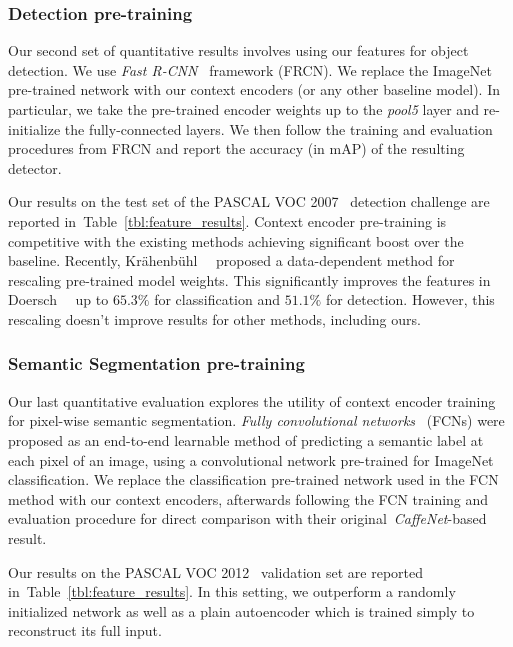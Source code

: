 \documentclass[10pt,twocolumn,letterpaper]{article}
\newcommand{\reftbl}[1]{Table~\ref{tbl:#1}}
\begin{document}
\subsubsection{Detection pre-training}
\label{sec:detect}
Our second set of quantitative results involves using our features for object detection.
We use \textit{Fast R-CNN}~\cite{fastrcnn} framework (FRCN).
We replace the ImageNet pre-trained network with our context encoders (or any other baseline model).
In particular, we take the pre-trained encoder weights up to the \textit{pool5} layer and re-initialize the fully-connected layers.
We then follow the training and evaluation procedures from FRCN and report the accuracy (in mAP) of the resulting detector.

Our results on the test set of the PASCAL VOC 2007~\cite{everingham2014pascal} detection challenge are reported in~\reftbl{feature_results}.
Context encoder pre-training is competitive with the existing methods achieving significant boost over the baseline.
Recently, Kr\"ahenb\"uhl~\etal~\cite{krahenbuhl2015data} proposed a data-dependent method for rescaling pre-trained model weights.
This significantly improves the features in Doersch~\etal~\cite{doersch2015unsupervised} up to $65.3\%$ for classification and $51.1\%$ for detection.
However, this rescaling doesn't improve results for other methods, including ours.


\subsubsection{Semantic Segmentation pre-training}
\label{sec:fcn}
Our last quantitative evaluation explores the utility of context encoder training for pixel-wise semantic segmentation.
\textit{Fully convolutional networks}~\cite{long2014fully} (FCNs) were proposed as an end-to-end learnable method of predicting a semantic label at each pixel of an image, using a convolutional network pre-trained for ImageNet classification.
We replace the classification pre-trained network used in the FCN method with our context encoders, afterwards following the FCN training and evaluation procedure for direct comparison with their original~\textit{CaffeNet}-based result.

Our results on the PASCAL VOC 2012~\cite{everingham2014pascal} validation set are reported in~\reftbl{feature_results}.
In this setting, we outperform a randomly initialized network as well as a plain autoencoder which is trained simply to reconstruct its full input.
\end{document}
